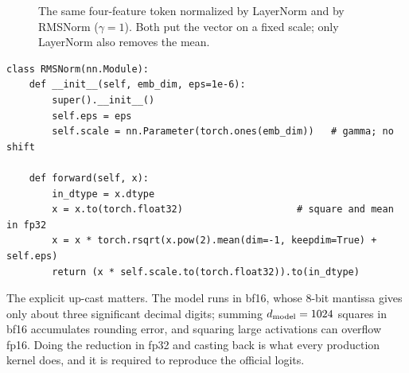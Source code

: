 \begin{figure}[t]
\centering
{}
\caption{The same four-feature token normalized by LayerNorm and by RMSNorm ($\gamma=1$). Both put
the vector on a fixed scale; only LayerNorm also removes the mean.}
\label{fig:modern:rmsvsln}
\end{figure}

\begin{lstlisting}[caption={RMSNorm with an fp32 accumulation (cf.\ \ident{llmsys/layers.py}).},label={lst:modern:rms}]
class RMSNorm(nn.Module):
    def __init__(self, emb_dim, eps=1e-6):
        super().__init__()
        self.eps = eps
        self.scale = nn.Parameter(torch.ones(emb_dim))   # gamma; no shift

    def forward(self, x):
        in_dtype = x.dtype
        x = x.to(torch.float32)                    # square and mean in fp32
        x = x * torch.rsqrt(x.pow(2).mean(dim=-1, keepdim=True) + self.eps)
        return (x * self.scale.to(torch.float32)).to(in_dtype)
\end{lstlisting}

The explicit up-cast matters. The model runs in bf16, whose 8-bit mantissa gives only about three
significant decimal digits; summing $d_{\text{model}}=1024$ squares in bf16 accumulates rounding error, and
squaring large activations can overflow fp16. Doing the reduction in fp32 and casting back is what
every production kernel does, and it is required to reproduce the official logits.


